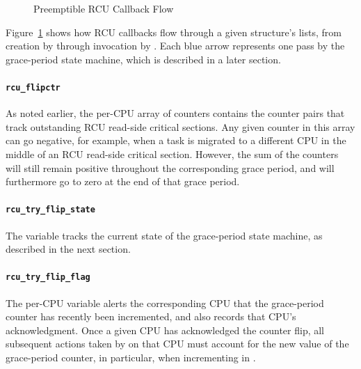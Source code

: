 \begin{figure}[htb]
\centering
{}
\caption{Preemptible RCU Callback Flow}
\label{app:rcuimpl:Preemptible RCU Callback Flow}
\end{figure}

Figure~\ref{app:rcuimpl:Preemptible RCU Callback Flow}
shows how RCU callbacks flow through a given
 structure's lists, from creation by
 through invocation by
.
Each blue arrow represents one pass by the grace-period state machine,
which is described in a later section.



\paragraph{{\tt rcu\_flipctr}}
\label{app:rcuimpl:rcu_flipctr}

As noted earlier, the 
per-CPU array of counters contains the
counter pairs that track outstanding RCU read-side critical sections.
Any given counter in this array can go negative, for example, when
a task is migrated to a different CPU in the middle of an RCU
read-side critical section.
However, the sum of the counters will
still remain positive throughout the corresponding grace period, and will
furthermore go to zero at the end of that grace period.

\paragraph{{\tt rcu\_try\_flip\_state}}
\label{app:rcuimpl:rcu_try_flip_state}

The  variable tracks the current state of
the grace-period state machine, as described in the next section.

\paragraph{{\tt rcu\_try\_flip\_flag}}
\label{app:rcuimpl:rcu_try_flip_flag}

The  per-CPU variable alerts the corresponding
CPU that the grace-period counter has recently been incremented, and
also records that CPU's acknowledgment.
Once a given CPU has acknowledged the counter flip, all subsequent actions
taken by  on that CPU must account for the
new value of the grace-period counter, in particular, when incrementing
 in .

